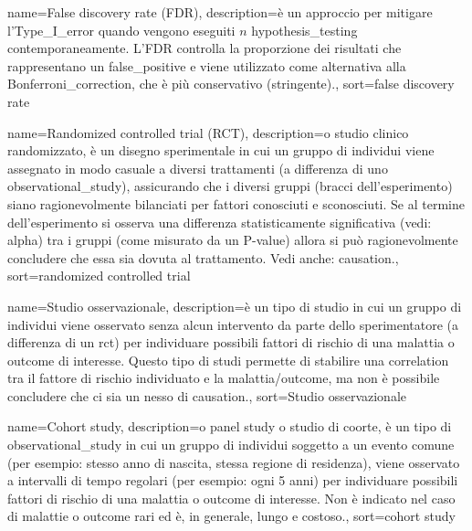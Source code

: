 {
	 name={False discovery rate (FDR)},
	 description={\`e un approccio per mitigare l'\gls{Type_I_error} quando vengono eseguiti $n$ \gls{hypothesis_testing} contemporaneamente. L'FDR controlla la proporzione dei risultati che rappresentano un \gls{false_positive} e viene utilizzato come alternativa alla \gls{Bonferroni_correction}, che \`e più conservativo (stringente).},
	 sort={false discovery rate}
}




{
	 name={Randomized controlled trial (RCT)},
	 description={o studio clinico randomizzato, \`e un disegno sperimentale in cui un gruppo di individui viene assegnato in modo casuale a diversi trattamenti (a differenza di uno \gls{observational_study}), assicurando che i diversi gruppi (bracci dell'esperimento) siano ragionevolmente bilanciati per fattori conosciuti e sconosciuti. Se al termine dell'esperimento si osserva una differenza statisticamente significativa (vedi: \gls{alpha}) tra i gruppi (come misurato da un \gls{P-value}) allora si pu\`o ragionevolmente concludere che essa sia dovuta al trattamento. Vedi anche: \gls{causation}.},
	 sort={randomized controlled trial}
}

{
	 name={Studio osservazionale},
	 description={\`e un tipo di studio in cui un gruppo di individui viene osservato senza alcun intervento da parte dello sperimentatore (a differenza di un \gls{rct}) per individuare possibili fattori di rischio di una malattia o outcome di interesse. Questo tipo di studi permette di stabilire una \gls{correlation} tra il fattore di rischio individuato e la malattia/outcome, ma non \`e possibile concludere che ci sia un nesso di \gls{causation}.},
	 sort={Studio osservazionale}
}

{
	 name={Cohort study},
	 description={o panel study o studio di coorte, \`e un tipo di \gls{observational_study} in cui un gruppo di individui soggetto a un evento comune (per esempio: stesso anno di nascita, stessa regione di residenza), viene osservato a intervalli di tempo regolari (per esempio: ogni 5 anni) per individuare possibili fattori di rischio di una malattia o outcome di interesse. Non \`e indicato nel caso di malattie o outcome rari ed \`e, in generale, lungo e costoso.},
	 sort={cohort study}
}



